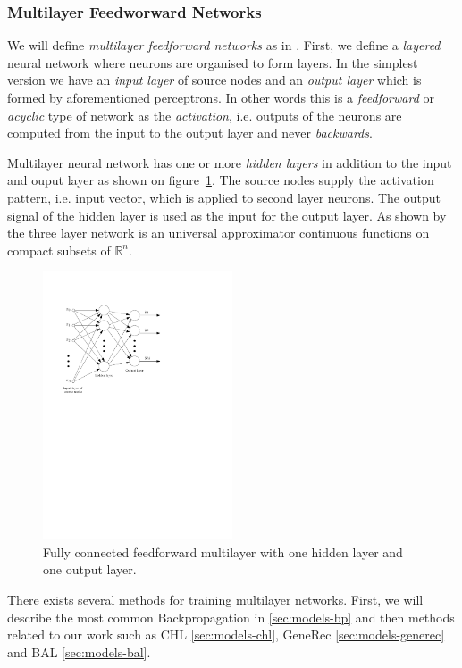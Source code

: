 \subsubsection{Multilayer Feedworward Networks} 
\label{sec:theory-multilayer} 

We will define \emph{multilayer feedforward networks} as in \citet{haykin1994neural}. First, we define a \emph{layered} neural network where neurons are organised to form layers. In the simplest version we have an \emph{input layer} of source nodes and an \emph{output layer} which is formed by aforementioned perceptrons. In other words this is a \emph{feedforward} or \emph{acyclic} type of network as the \emph{activation}, i.e. outputs of the neurons are computed from the input to the output layer and never \emph{backwards}. 

Multilayer neural network has one or more \emph{hidden layers} in addition to the input and ouput layer as shown on figure~\ref{fig:multilayer}. The source nodes supply the activation pattern, i.e. input vector, which is applied to second layer neurons. The output signal of the hidden layer is used as the input for the output layer. As shown by \citet{cybenko1989approximation} the three layer network is an universal approximator continuous functions on compact subsets of $\mathbb{R}^n$.

\begin{figure}[H]
  \centering
  \includegraphics[width=0.5\textwidth]{img/multilayer.pdf}    
  \caption{Fully connected feedforward multilayer with one hidden layer and one output layer. } 
  \label{fig:multilayer}
\end{figure}

There exists several methods for training multilayer networks. First, we will describe the most common Backpropagation in \ref{sec:models-bp} and then methods related to our work such as CHL \ref{sec:models-chl}, GeneRec \ref{sec:models-generec} and BAL \ref{sec:models-bal}. 
